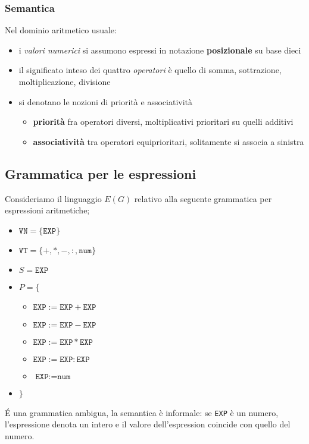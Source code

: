 \subsubsection{Semantica}
Nel dominio aritmetico usuale:
\begin{itemize}
    \item i \textit{valori numerici} si assumono espressi in notazione \textbf{posizionale} su base dieci
    \item il significato inteso dei quattro \textit{operatori} è quello di somma, sottrazione, moltiplicazione, divisione
    \item si denotano le nozioni di priorità e associatività
    \begin{itemize}
        \item \textbf{priorità} fra operatori diversi, moltiplicativi prioritari su quelli additivi
        \item \textbf{associatività} tra operatori equiprioritari, solitamente si associa a sinistra
    \end{itemize}
\end{itemize}

\subsection{Grammatica per le espressioni}
Consideriamo il linguaggio $E(G)$ relativo alla seguente grammatica per espressioni aritmetiche;
\begin{itemize}[label={}]
    \item $\texttt{VN} = \{ \texttt{EXP}\}$
    \item $\texttt{VT} = \{+, *, -, :, \texttt{num}\}$
    \item $S = \texttt{EXP}$
    \item $P = \{$
    \begin{itemize}[label={}]
        \item $\texttt{EXP} := \texttt{EXP} + \texttt{EXP}$
        \item $\texttt{EXP} := \texttt{EXP} - \texttt{EXP}$
        \item $\texttt{EXP} := \texttt{EXP} * \texttt{EXP}$
        \item $\texttt{EXP} := \texttt{EXP} : \texttt{EXP}$
        \item $\texttt{EXP} := \texttt{num}$ 
    \end{itemize}
    \item $\}$
\end{itemize}
\setlist{}
É una grammatica ambigua, la semantica è informale: se \texttt{EXP} è un numero, l'espressione denota un intero e il valore dell'espression coincide con quello del numero.

